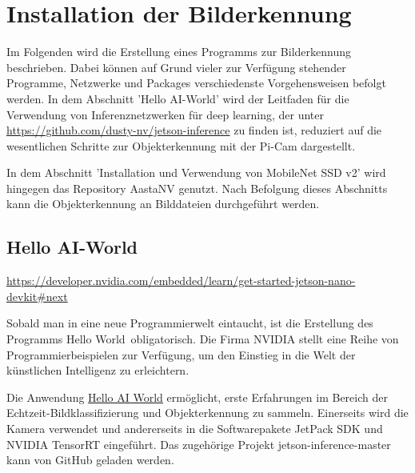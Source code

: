 %
%



\chapter{Installation der Bilderkennung}
Im Folgenden wird die Erstellung eines Programms zur Bilderkennung beschrieben. Dabei können auf Grund vieler zur Verfügung stehender Programme, Netzwerke und Packages verschiedenste Vorgehensweisen befolgt werden. In dem Abschnitt 'Hello AI-World' wird der 
Leitfaden für die Verwendung von Inferenznetzwerken für deep learning, der unter 
\textcolor{blue}{\url{https://github.com/dusty-nv/jetson-inference}} zu finden ist, reduziert auf die wesentlichen Schritte zur 
Objekterkennung mit der Pi-Cam dargestellt.

\medskip

In dem Abschnitt 'Installation und Verwendung von MobileNet SSD v2' wird hingegen das Repository AastaNV genutzt. 
Nach Befolgung dieses Abschnitts kann die Objekterkennung an Bilddateien durchgeführt werden.

\section{Hello AI-World}

\textcolor{blue}{\url{https://developer.nvidia.com/embedded/learn/get-started-jetson-nano-devkit\#next}}

Sobald man in eine neue Programmierwelt eintaucht, ist die Erstellung des Programms
\glqq Hello World\grqq\, obligatorisch. Die Firma NVIDIA stellt eine Reihe von
Programmierbeispielen zur Verfügung, um den Einstieg in die Welt der künstlichen
Intelligenz zu erleichtern. \cite{JetsonHelloWorld:2020}

\bigskip

Die Anwendung \href{https://github.com/dusty-nv/jetson-inference}{Hello AI World} ermöglicht, erste Erfahrungen im Bereich der Echtzeit-Bildklassifizierung und Objekterkennung zu sammeln.
Einerseits wird die Kamera verwendet und andererseits in die Softwarepakete JetPack SDK und NVIDIA TensorRT eingeführt. Das zugehörige Projekt \glqq jetson-inference-master\grqq\,
kann von GitHub geladen werden. \cite{GitHubJetsonInferenceMaster:2020}



